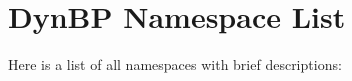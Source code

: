 \section{DynBP Namespace List}
Here is a list of all namespaces with brief descriptions:\begin{CompactList}
\item{}
\item{}
\item{}
\end{CompactList}
